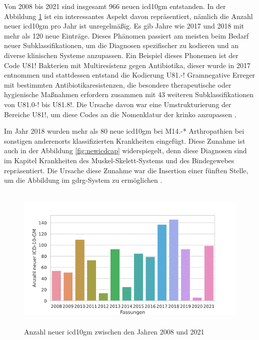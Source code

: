 Von 2008 bis 2021 sind insgesamt \textsf{966} neuen \ac{icd10gm} entstanden. In der Abbildung \ref{fig:newicdyear} ist ein interessantes Aspekt davon repräsentiert, nämlich die Anzahl neuer \ac{icd10gm} pro Jahr ist unregelmäßig. Es gib Jahre wie 2017 und 2018 mit mehr als \textsf{120} neue Einträge. Dieses Phänomen passiert am meisten beim Bedarf neuer Subklassifikationen, um die Diagnosen spezifischer zu kodieren und an diverse klinischen Systeme anzupassen. Ein Beispiel dieses Phonemen ist der Code \textsf{U81!} \textsf{Bakterien mit Multiresistenz gegen Antibiotika}, dieser wurde in 2017 entnommen und stattdessen entstand die Kodierung \textsf{U81.-!} \textsf{Gramnegative Erreger mit bestimmten Antibiotikaresistenzen, die besondere therapeutische oder hygienische Maßnahmen erfordern} zusammen mit \textsf{43} weiteren Subklassifikationen von \textsf{U81.0-!} bis \textsf{U81.8!}. Die Ursache davon war eine Umstrukturierung der Bereiche \textsf{U81!}, um diese Codes an die Nomenklatur der \ac{krinko} anzupassen \cite{erreg17}.

Im Jahr 2018 wurden mehr als \textsf{80} neue \ac{icd10gm} bei \textsf{M14.-*} \textsf{Arthropathien bei sonstigen anderenorts klassifizierten Krankheiten} eingefügt. Diese Zunahme ist auch in der Abbildung \ref{fig:newicdcap} widerspiegelt, denn diese Diagnosen sind im Kapitel \textsf{Krankheiten des Muskel-Skelett-Systems und des Bindegewebes} repräsentiert. Die Ursache diese Zunahme war die Insertion einer fünften Stelle, um die Abbildung im \ac{gdrg}-System zu ermöglichen \cite{musk18}.


\begin{figure}[ht]
	\centering
	\includegraphics[height=7cm]{figures/newicdyear}
	\caption[Neue \acs{icd10gm} pro Jahr]{Anzahl neuer \acs{icd10gm} zwischen den Jahren 2008 und 2021}
	\label{fig:newicdyear}
\end{figure} 

